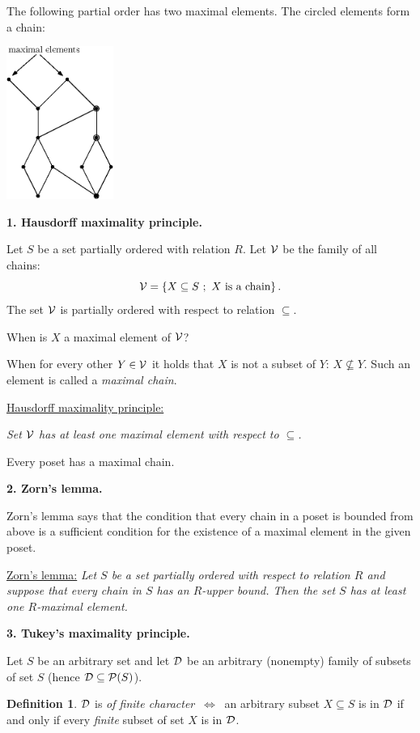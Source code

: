 \documentclass[11pt,paper=b5,footinclude,headinclude]{scrbook} %
\def\cee {{~\Leftrightarrow~}}
\theoremstyle{remark}
\theoremstyle{definition} %
\newtheorem*{definition}{Definition}
\theoremstyle{theorem} %
\begin{document}
The following partial order has two maximal elements. The circled elements form a chain:
\begin{center}
\includegraphics[height=50mm]{verige-en.eps}
\end{center}

\bigskip
\textbf{ 1. Hausdorff maximality principle.}

Let $S$ be a set partially ordered with relation $R$.
Let ${\cal V}$ be the family of all chains:
$${\cal V} = \{X\subseteq S~;~X \textrm { is a chain}\}\,.$$
The set ${\cal V}$ is partially ordered with respect to relation $\subseteq$.

When is $X$ a maximal element of ${\cal V}$?

When for every other $Y\in {\cal V}$ it holds that $X$ is not a subset of $Y$: $X\nsubseteq Y$.
Such an element is called a {\em maximal chain}.

\bigskip
\underline{Hausdorff maximality principle:}

{\em Set  ${\cal V}$ has at least one maximal element with respect to $\subseteq$.}

Every poset has a maximal chain.

\bigskip
\textbf{ 2. Zorn's lemma.}

Zorn's lemma says that the condition that every chain in a poset is bounded from above is a sufficient condition for the existence of a maximal element
in the given poset.

\medskip
\underline{Zorn's lemma:} {\em Let $S$ be a set partially ordered with respect to relation $R$
and suppose that every chain in $S$ has an $R$-upper bound.
Then the set $S$ has at least one $R$-maximal element.}

\bigskip
\bigskip
\textbf{ 3. Tukey's maximality principle.}

Let $S$ be an arbitrary set and let ${\cal D}$ be an arbitrary (nonempty) family of subsets of set $S$
(hence ${\cal D}\subseteq {\cal P}(S)$).

\begin{definition}
${\cal D}$ is {\em of finite character} $\cee$ an arbitrary subset $X\subseteq S$ is in ${\cal D}$ if and only if every {\em finite} subset of set $X$
is in ${\cal D}$.
\end{definition}
\end{document}
